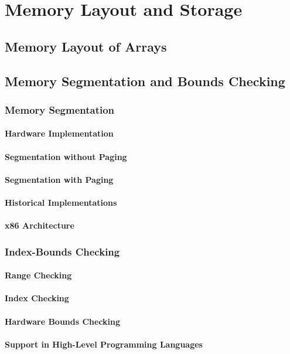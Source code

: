 \documentclass[12pt, oneside]{book}
\begin{document}
	\chapter{Memory Layout and Storage}
	\section{Memory Layout of Arrays}
	\section{Memory Segmentation and Bounds Checking}
	\subsection{Memory Segmentation}
	\subsubsection{Hardware Implementation}
	\subsubsection{Segmentation without Paging}
	\subsubsection{Segmentation with Paging}
	\subsubsection{Historical Implementations}
	\subsubsection{x86 Architecture}
	\subsection{Index-Bounds Checking}
	\subsubsection{Range Checking}
	\subsubsection{Index Checking}
	\subsubsection{Hardware Bounds Checking}
	\subsubsection{Support in High-Level Programming Languages}
\end{document}
